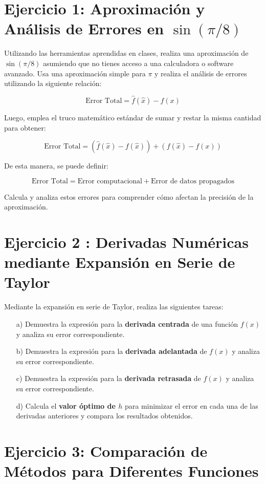 \documentclass{article}
\begin{document}
\section*{Ejercicio 1: Aproximación y Análisis de Errores en \(\sin(\pi/8)\)}

Utilizando las herramientas aprendidas en clases, realiza una aproximación de \(\sin(\pi/8)\) asumiendo que no tienes acceso a una calculadora o software avanzado. Usa una aproximación simple para \(\pi\) y realiza el análisis de errores utilizando la siguiente relación:

\[
\text{Error Total} = \hat{f}(\hat{x}) - f(x)
\]

Luego, emplea el truco matemático estándar de sumar y restar la misma cantidad para obtener:

\[
\text{Error Total} = (\hat{f}(\hat{x}) - f(\hat{x})) + (f(\hat{x}) - f(x))
\]

De esta manera, se puede definir:

\[
\text{Error Total} = \text{Error computacional} + \text{Error de datos propagados}
\]

Calcula y analiza estos errores para comprender cómo afectan la precisión de la aproximación.

\section*{Ejercicio 2 : Derivadas Numéricas mediante Expansión en Serie de Taylor}

Mediante la expansión en serie de Taylor, realiza las siguientes tareas:

\begin{enumerate}
    \item[a)] Demuestra la expresión para la \textbf{derivada centrada} de una función \(f(x)\) y analiza su error correspondiente.
    \item[b)] Demuestra la expresión para la \textbf{derivada adelantada} de \(f(x)\) y analiza su error correspondiente.
    \item[c)] Demuestra la expresión para la \textbf{derivada retrasada} de \(f(x)\) y analiza su error correspondiente.
    \item[d)] Calcula el \textbf{valor óptimo de \(h\)} para minimizar el error en cada una de las derivadas anteriores y compara los resultados obtenidos.
\end{enumerate}

\section*{Ejercicio 3: Comparación de Métodos para Diferentes Funciones}
\end{document}
